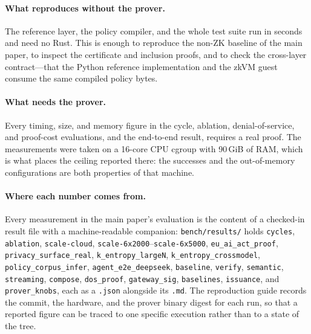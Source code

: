 \documentclass[10pt,journal,compsoc]{IEEEtran}
\begin{document}
\paragraph{What reproduces without the prover.} The reference layer, the policy
compiler, and the whole test suite run in seconds and need no Rust. This is
enough to reproduce the non-ZK baseline of the main paper, to inspect the
certificate and inclusion proofs, and to check the cross-layer contract---that
the Python reference implementation and the zkVM guest consume the same
compiled policy bytes.

\paragraph{What needs the prover.} Every timing, size, and memory figure in the
cycle, ablation, denial-of-service, and proof-cost evaluations, and the
end-to-end result, requires a real proof. The measurements were taken on a
16-core CPU cgroup with 90\,GiB of RAM, which is what places the ceiling
reported there: the successes and the out-of-memory configurations are both
properties of that machine.

\paragraph{Where each number comes from.} Every measurement in the main paper's
evaluation is the content of a checked-in result file with a machine-readable
companion: \texttt{bench/results/} holds \texttt{cycles}, \texttt{ablation},
\texttt{scale-cloud}, \texttt{scale-6x2000}--\texttt{scale-6x5000},
\texttt{eu\_ai\_act\_proof}, \texttt{privacy\_surface\_real},
\texttt{k\_entropy\_largeN}, \texttt{k\_entropy\_crossmodel},
\texttt{policy\_corpus\_infer}, \texttt{agent\_e2e\_deepseek},
\texttt{baseline}, \texttt{verify}, \texttt{semantic}, \texttt{streaming},
\texttt{compose}, \texttt{dos\_proof}, \texttt{gateway\_sig},
\texttt{baselines}, \texttt{issuance}, and \texttt{prover\_knobs}, each as a
\texttt{.json} alongside its \texttt{.md}. The reproduction guide records the
commit, the hardware, and the prover binary digest for each run, so that a
reported figure can be traced to one specific execution rather than to a state
of the tree.
\end{document}
